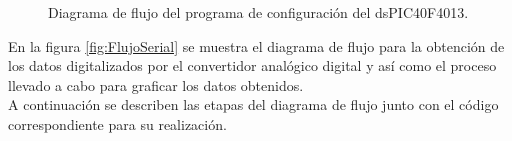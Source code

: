 	\begin{figure}[htbp!]
		\centering
		\caption{Diagrama de flujo del programa de configuración del dsPIC40F4013.}
		\label{fig:ConfiguracionMicro}
	\end{figure}
\pagebreak
En la figura \ref{fig:FlujoSerial} se muestra el diagrama de flujo para la obtención de los datos digitalizados por el convertidor analógico digital y así como el proceso llevado a cabo para graficar los datos obtenidos.\\

A continuación se describen las etapas del diagrama de flujo junto con el código correspondiente para su realización.

